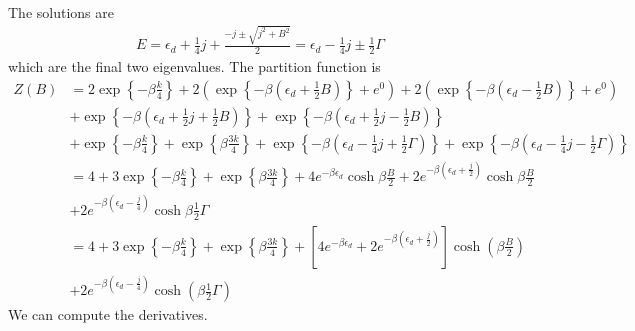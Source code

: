 \documentclass[12pt,twoside]{article}
\numberwithin{equation}{section}
\begin{document}
The solutions are
\begin{equation}\begin{aligned}
	E = \epsilon_d + \frac{1}{4}j + \frac{-j \pm \sqrt{j^2 + B^2}}{2} = \epsilon_d - \frac{1}{4}j \pm \frac{1}{2}\Gamma
\end{aligned}\end{equation}
which are the final two eigenvalues.
\pb The partition function is
\begin{equation}\begin{aligned}
	Z(B) &= 2 \exp\left\{-\beta \frac{k}{4}\right\} + 2\left( \exp\left\{-\beta\left(\epsilon_d + \frac{1}{2} B\right)\right\} + e^0\right) + 2\left( \exp\left\{-\beta\left(\epsilon_d - \frac{1}{2} B\right)\right\} + e^0\right) \\
	     &+ \exp\left\{-\beta\left(\epsilon_d + \frac{1}{2}j + \frac{1}{2} B\right)\right\} + \exp\left\{-\beta\left(\epsilon_d + \frac{1}{2}j - \frac{1}{2} B\right)\right\} \\
	     &+ \exp\left\{-\beta \frac{k}{4}\right\} + \exp\left\{\beta \frac{3k}{4}\right\} + \exp\left\{-\beta\left(\epsilon_d - \frac{1}{4}j + \frac{1}{2}\Gamma\right)\right\} + \exp\left\{-\beta\left( \epsilon_d- \frac{1}{4}j - \frac{1}{2}\Gamma\right)\right\}\\
	     &= 4 + 3\exp\left\{-\beta \frac{k}{4}\right\} + \exp\left\{\beta \frac{3k}{4}\right\} + 4e^{-\beta \epsilon_d}\cosh \beta \frac{B}{2} + 2e^{-\beta \left(\epsilon_d + \frac{j}{2}\right)}\cosh \beta \frac{B}{2}\\
	     &+ 2e^{-\beta\left(\epsilon_d - \frac{j}{4}\right)}\cosh \beta \frac{1}{2}\Gamma\\
	     &= 4 + 3\exp\left\{-\beta \frac{k}{4}\right\} + \exp\left\{\beta \frac{3k}{4}\right\} + \left[4e^{-\beta \epsilon_d} + 2e^{-\beta \left(\epsilon_d + \frac{j}{2}\right)}\right]\cosh \left(\beta \frac{B}{2}\right) \\
	     &+ 2e^{-\beta\left(\epsilon_d - \frac{j}{4}\right)}\cosh \left(\beta \frac{1}{2}\Gamma\right)
\end{aligned}\end{equation}
We can compute the derivatives.
\end{document}

